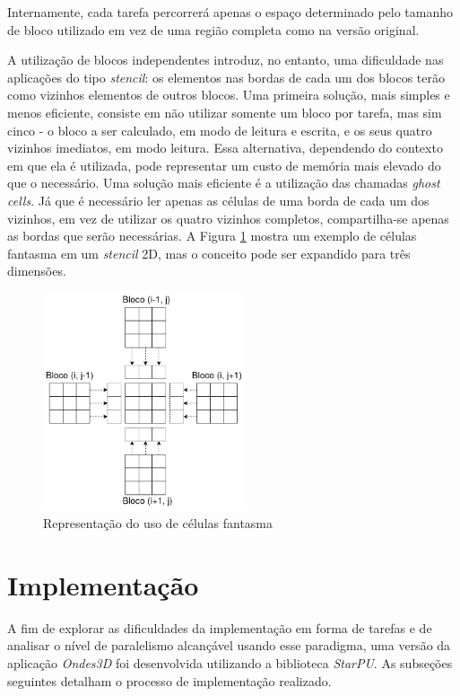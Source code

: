 \documentclass[cic,tc]{iiufrgs}
\begin{document}
Internamente, cada tarefa percorrerá apenas o espaço determinado pelo tamanho de bloco utilizado em vez de uma região completa como na versão original.

A utilização de blocos independentes introduz, no entanto, uma dificuldade nas aplicações do tipo \textit{stencil}: os elementos nas bordas de cada um dos blocos terão como vizinhos
elementos de outros blocos. Uma primeira solução, mais simples e menos eficiente, consiste em não utilizar somente um bloco por tarefa, mas sim cinco - o bloco a ser calculado, em
modo de leitura e escrita, e os seus quatro vizinhos imediatos, em modo leitura. Essa alternativa, dependendo do contexto em que ela é utilizada, pode representar um custo de memória mais
elevado do que o necessário. Uma solução mais eficiente é a utilização das chamadas \textit{ghost cells}. Já que é necessário ler apenas as células de uma borda de cada um dos vizinhos, em
vez de utilizar os quatro vizinhos completos, compartilha-se apenas as bordas que serão necessárias. A Figura \ref{fig:ghost_cells} mostra um exemplo de células fantasma em um \textit{stencil} 2D,
mas o conceito pode ser expandido para três dimensões.

\begin{figure}[!htb]
    \caption{Representação do uso de células fantasma}
    \begin{center}
      \includegraphics[width=16em]{ghost_cells}
    \end{center}
    \label{fig:ghost_cells}
\end{figure}

\section{Implementação}

A fim de explorar as dificuldades da implementação em forma de tarefas e de analisar o nível de paralelismo alcançável usando esse paradigma, uma versão da aplicação \textit{Ondes3D} foi
desenvolvida utilizando a biblioteca \textit{StarPU}. As subseções seguintes detalham o processo de implementação realizado.
\end{document}

